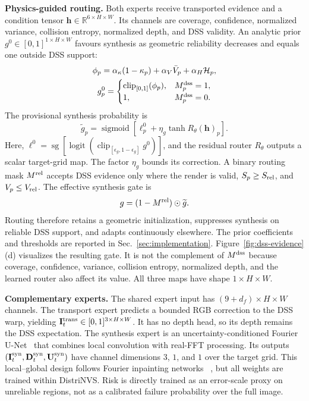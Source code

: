 \documentclass[letterpaper,10pt,conference]{ieeeconf}
\newcommand{\R}{\mathbb{R}}
\newcommand{\I}{\mathbf{I}}
\newcommand{\D}{\mathbf{D}}
\newcommand{\U}{\mathbf{U}}
\begin{document}
\noindent\textbf{Physics-guided routing.}
Both experts receive transported evidence and a condition tensor
$\mathbf h\in\R^{6\times H\times W}$. Its channels are coverage, confidence,
normalized variance, collision entropy, normalized depth, and DSS validity.
An analytic prior $g^0\in[0,1]^{1\times H\times W}$ favours synthesis as
geometric reliability decreases and equals one outside DSS support:
\begin{equation}
\begin{gathered}
 \phi_p=\alpha_\kappa(1-\kappa_p)+\alpha_V\bar V_p
 +\alpha_H\mathcal H_p,\\
 g_p^0=\begin{cases}
 \operatorname{clip}_{[0,1]}(\phi_p),&M_p^{\rm dss}=1,\\
 1,&M_p^{\rm dss}=0.
 \end{cases}
\end{gathered}
\label{eq:physics-prior}
\end{equation}
The provisional synthesis probability is
\begin{equation}
 \widetilde g_p=\operatorname{sigmoid}\!\left[
 \ell_p^0+\eta_g\tanh R_\theta(\mathbf h)_p\right].
\label{eq:router}
\end{equation}
Here, $\ell^0=\operatorname{sg}[\operatorname{logit}(
\operatorname{clip}_{[\epsilon_g,1-\epsilon_g]}g^0)]$, and the residual router
$R_\theta$ outputs a scalar target-grid map. The factor $\eta_g$ bounds its
correction. A binary routing mask $M^{\rm rel}$ accepts DSS evidence only
where the render is valid, $S_p\geq S_{\rm rel}$, and
$V_p\leq V_{\rm rel}$. The effective synthesis gate is
\begin{equation}
 g=(1-M^{\rm rel})\odot\widetilde g.
 \label{eq:effective-gate}
\end{equation}
Routing therefore retains a geometric initialization, suppresses synthesis on
reliable DSS support, and adapts continuously elsewhere. The prior coefficients
and thresholds are reported in Sec.~\ref{sec:implementation}.
Figure~\ref{fig:dss-evidence}(d) visualizes the resulting gate. It is not the
complement of $M^{\rm dss}$ because coverage, confidence, variance, collision
entropy, normalized depth, and the learned router also affect its value. All
three maps have shape $1\times H\times W$.

\noindent\textbf{Complementary experts.}
The shared expert input has $(9+d_f)\times H\times W$ channels. The transport
expert predicts a bounded RGB correction to the DSS warp, yielding
$\I_t^{\rm trans}\in[0,1]^{3\times H\times W}$. It has no depth head, so its
depth remains the DSS expectation. The synthesis expert is an
uncertainty-conditioned Fourier U-Net~\cite{ronneberger2015unet} that combines
local convolution with real-FFT processing. Its outputs
$(\I_t^{\rm syn},\D_t^{\rm syn},\U_t^{\rm syn})$ have channel dimensions
$3$, $1$, and $1$ over the target grid. This local--global design follows
Fourier inpainting networks
~\cite{suvorov2022lama,chu2023uffc}, but all weights are trained within
DistriNVS. Risk is directly trained as an error-scale proxy on unreliable
regions, not as a calibrated failure probability over the full image.
\end{document}
